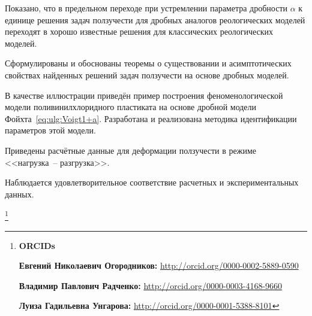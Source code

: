 Показано, что в предельном переходе при устремлении параметра дробности $\alpha$ к единице решения задач ползучести для дробных аналогов реологических моделей переходят в хорошо известные решения для классических реологических моделей.

Сформулированы и обоснованы теоремы о существовании и асимптотических свойствах найденных решений задач ползучести на основе дробных моделей.



В качестве иллюстрации приведён пример построения феноменологической модели поливинилхлоридного пластиката на основе дробной модели Фойхта~\eqref{eq:ulg:Voigt1+a}. Разработана и реализована методика идентификации параметров этой модели.

Приведены расчётные данные для деформации ползучести в режиме <<нагрузка~-- разгрузка>>. 

Наблюдается удовлетворительное соответствие расчетных и экспериментальных данных.







\thanks{{\bf ORCIDs}



{\bf Евгений Николаевич Огородников:} \url{http://orcid.org/0000-0002-5889-0590}



{\bf Владимир Павлович Радченко:} \url{http://orcid.org/0000-0003-4168-9660}



{\bf Луиза Гадильевна Унгарова:} \url{http://orcid.org/0000-0001-5388-8101}





}









\RusRef







	

